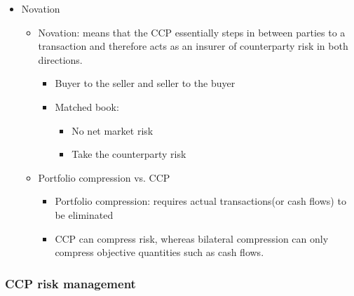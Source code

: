 \begin{itemize}
\begin{itemize}
\end{itemize}

\item Novation
\begin{itemize}
    \item Novation: means that the CCP essentially steps in between parties to a transaction and therefore acts as an insurer of counterparty risk in both directions.
    \begin{itemize}
        \item Buyer to the seller and seller to the buyer
        \item Matched book:
        \begin{itemize}
            \item No net market risk
            \item Take the counterparty risk
        \end{itemize}
    \end{itemize}
  \item Portfolio compression vs. CCP
  \begin{itemize}
      \item  Portfolio compression: requires actual transactions(or cash flows) to be eliminated
      \item CCP can compress risk, whereas bilateral compression can only compress objective quantities such as cash flows.
  \end{itemize}

\end{itemize}

\end{itemize}



\subsubsection{CCP risk management}

